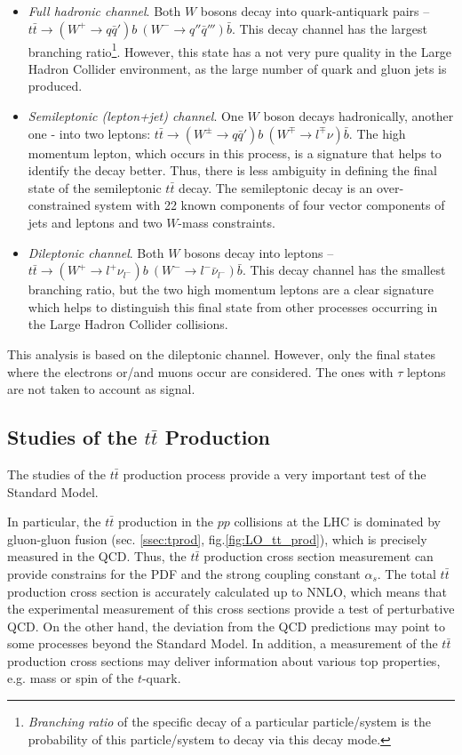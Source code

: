 \begin{itemize}
 \item \textit{Full hadronic channel}. Both $W$ bosons decay into quark-antiquark pairs -- $t\bar{t} \rightarrow (W^{+} \rightarrow q\bar{q}')b\:(W^{-} \rightarrow q''\bar{q}''')\bar{b}$.
 This decay channel has the largest branching ratio\footnote{\textit{Branching ratio} of the specific decay of a particular particle/system is the probability of this particle/system
 to decay via this decay mode.}. However, this state has a not very pure quality in the Large Hadron Collider environment, as the large number of quark and gluon jets is produced.
 
 \item \textit{Semileptonic (lepton+jet) channel}. One $W$ boson decays hadronically, another one - into two leptons:  $t\bar{t} \rightarrow (W^{\pm} \rightarrow q\bar{q}')b \: (W^{\mp} \rightarrow l^{\mp}\nu)\bar{b}$.
 The high momentum lepton, which occurs in this process, is a signature that helps to identify the decay better. Thus, there is less
 ambiguity in defining the final state of the semileptonic $t\bar{t}$ decay. The semileptonic decay is an over-constrained system with 22 known components of four vector components of
 jets and leptons and two $W$-mass constraints.
 
 \item \textit{Dileptonic channel}. Both $W$ bosons decay into leptons -- $t\bar{t} \rightarrow (W^{+} \rightarrow l^{+}\nu_{l^{-}})b \: (W^{-} \rightarrow l^{-}\bar{\nu}_{l^{-}})\bar{b}$.
 This decay channel has the smallest branching ratio, but the two high momentum leptons are a clear signature which helps to distinguish this final state from other processes
 occurring in the Large Hadron Collider collisions.
\end{itemize}

This analysis is based on the dileptonic channel. However, only the final states where the electrons or/and muons occur are considered. The ones with $\tau$ leptons are 
not taken to account as signal.

\subsection{Studies of the $t\bar{t}$ Production}

The studies of the $t\bar{t}$ production process provide a very important test of the Standard Model. 

In particular, the $t\bar{t}$ production in the $pp$ collisions at the LHC is dominated by gluon-gluon fusion (sec. \ref{ssec:tprod}, fig.\ref{fig:LO_tt_prod}), which 
is precisely measured in the QCD. Thus, the $t\bar{t}$ production cross section measurement can provide constrains for the PDF and the strong coupling constant $\alpha_s$.
The total $t\bar{t}$ production cross section is accurately calculated up to NNLO, which means that the experimental measurement of this cross sections provide a 
test of perturbative QCD.
On the other hand, the deviation from the QCD predictions may point to some processes beyond the Standard Model. In addition, a measurement of the $t\bar{t}$ production 
cross sections may deliver information about various top properties, e.g. mass or spin of the $t$-quark.